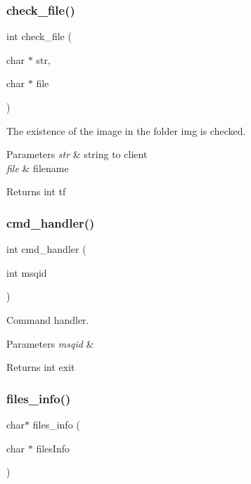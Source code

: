 \subsubsection{check\+\_\+file()}
{\footnotesize\ttfamily int check\+\_\+file (\begin{DoxyParamCaption}\item[{char $\ast$}]{str,  }\item[{char $\ast$}]{file }\end{DoxyParamCaption})}



The existence of the image in the folder img is checked. 


\begin{DoxyParams}{Parameters}
{\em str} & string to client \\
\hline
{\em file} & filename \\
\hline
\end{DoxyParams}
\begin{DoxyReturn}{Returns}
int tf 
\end{DoxyReturn}
\mbox{\label{fileserv_8c_a975d9337db509c0204b110f51d723160}} 
\subsubsection{cmd\+\_\+handler()}
{\footnotesize\ttfamily int cmd\+\_\+handler (\begin{DoxyParamCaption}\item[{int}]{msqid }\end{DoxyParamCaption})}



Command handler. 


\begin{DoxyParams}{Parameters}
{\em msqid} & \\
\hline
\end{DoxyParams}
\begin{DoxyReturn}{Returns}
int exit 
\end{DoxyReturn}
\mbox{\label{fileserv_8c_a28f9a6d37e4dbc8b5bf5fad1025285e3}} 
\subsubsection{files\+\_\+info()}
{\footnotesize\ttfamily char$\ast$ files\+\_\+info (\begin{DoxyParamCaption}\item[{char $\ast$}]{files\+Info }\end{DoxyParamCaption})}




